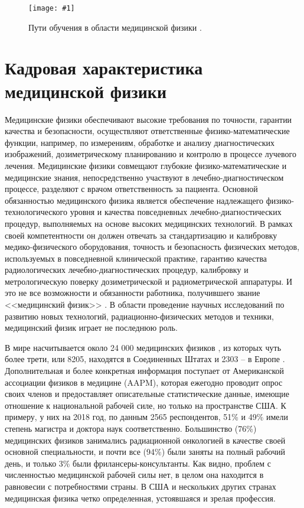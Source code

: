 \documentclass[a4paper,10pt]{extarticle}
\newcommand{\addimg}[4]{ %
    \begin{figure}
        \centering
        \texttt{[image: \#1]}
        \caption{#3} \label{#4}
    \end{figure}
}
\begin{document}
\addimg{ed}{1}{Пути обучения в области медицинской физики \cite{Silverstein}.}{ed}




\section{Кадровая характеристика медицинской физики}
Медицинские физики обеспечивают высокие требования по точности, гарантии качества и безопасности, осуществляют ответственные физико-математические функции, например, по измерениям, обработке и анализу диагностических изображений, дозиметрическому планированию и контролю в процессе лучевого лечения. Медицинские физики совмещают глубокие физико-математические и медицинские знания, непосредственно участвуют в лечебно-диагностическом процессе, разделяют с врачом ответственность за пациента. Основной обязанностью медицинского физика является обеспечение надлежащего физико-технологического уровня и качества повседневных лечебно-диагностических процедур, выполняемых на основе высоких медицинских технологий. В рамках своей компетентности он должен отвечать за стандартизацию и калибровку медико-физического оборудования, точность и безопасность физических методов, используемых в повседневной клинической практике, гарантию качества радиологических лечебно-диагностических процедур, калибровку и метрологическую поверку дозиметрической и радиометрической аппаратуры. И это не все возможности и обязанности работника, получившего звание <<медицинский физик>> \cite{RP174}. В области проведение научных исследований по развитию новых технологий, радиационно-физических методов и техники, медицинский физик играет не последнюю роль.

В мире насчитывается около 24 000 медицинских физиков \cite{IOMP}, из которых чуть более трети, или 8205, находятся в Соединенных Штатах \cite{AAPM1} и 2303 -- в Европе \cite{Lievens}. Дополнительная и более конкретная информация поступает от Американской ассоциации физиков в медицине (AAPM), которая ежегодно проводит опрос своих членов и предоставляет описательные статистические данные, имеющие отношение к национальной рабочей силе, но только на пространстве США. К примеру, у них на 2018 год, по данным 2565 респондентов, 51\% и 49\% имели степень магистра и доктора наук соответственно. Большинство (76\%)  медицинских физиков занимались радиационной онкологией в качестве своей основной специальности, и почти все (94\%) были заняты на полный рабочий день, и только 3\% были фрилансеры-консультанты. Как видно, проблем с численностью медицинской рабочей силы нет, в целом она находится в равновесии с потребностями страны. В США и нескольких других странах медицинская физика четко определенная, устоявшаяся и зрелая профессия. 
\end{document}
